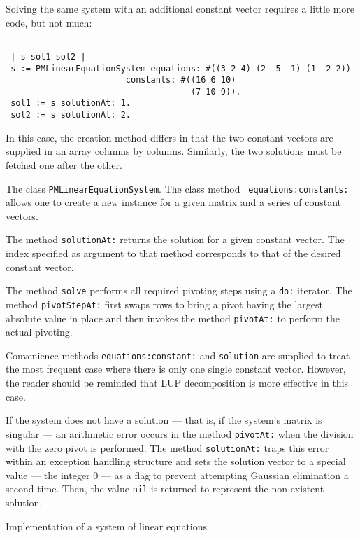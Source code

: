 \documentclass[twoside]{book}
\begin{document}
Solving the same system with an additional constant vector
requires a little more code, but not much:
\begin{codeExample}
\begin{verbatim}

 | s sol1 sol2 |
 s := PMLinearEquationSystem equations: #((3 2 4) (2 -5 -1) (1 -2 2))
                        constants: #((16 6 10)
                                     (7 10 9)).
 sol1 := s solutionAt: 1.
 sol2 := s solutionAt: 2.
\end{verbatim}
\end{codeExample}
In this case, the creation method differs in that the two constant
vectors are supplied in an array columns by columns. Similarly,
the two solutions must be fetched one after the other.

The class {\tt PMLinearEquationSystem}. The class method {\tt
equations:constants:} allows one to create a new instance for a given
matrix and a series of constant vectors.

The method {\tt solutionAt:} returns the solution for a given
constant vector. The index specified as argument to that method
corresponds to that of the desired constant vector.


The method {\tt solve} performs all required pivoting steps using
a {\tt do:} iterator. The method {\tt pivotStepAt:} first swaps
rows to bring a pivot having the largest absolute value in place
and then invokes the method {\tt pivotAt:} to perform the actual
pivoting.

Convenience methods {\tt equations:constant:} and {\tt solution}
are supplied to treat the most frequent case where there is only
one single constant vector. However, the reader should be reminded
that LUP decomposition is more effective in this case.

If the system does not have a solution --- that is, if the
system's matrix is singular --- an arithmetic error occurs in the
method {\tt pivotAt:} when the division with the zero pivot is
performed. The method {\tt solutionAt:} traps this error within an
exception handling structure and sets the solution vector to a
special value --- the integer 0 --- as a flag to prevent
attempting Gaussian elimination a second time. Then, the value
{\tt nil} is returned to represent the non-existent solution.

\begin{listing} Implementation of a system of linear equations
\label{ls:lineqs}

\end{listing}
\end{document}
